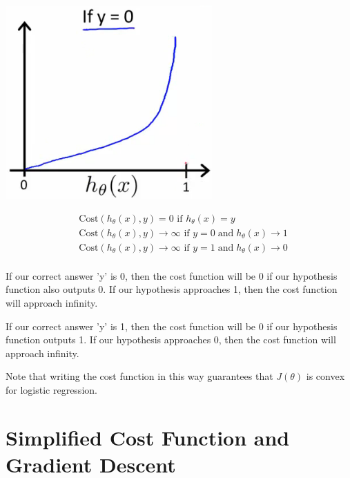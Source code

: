 \documentclass[10pt,a4paper,UTF8]{article}
\begin{document}
\begin{center}
\includegraphics[width=.9\linewidth]{../../img/computer_ng/20171008costFunction2.png}
\end{center}

\begin{align*}& \mathrm{Cost}(h_\theta(x),y) = 0 \text{ if } h_\theta(x) = y \\ & \mathrm{Cost}(h_\theta(x),y) \rightarrow \infty \text{ if } y = 0 \; \mathrm{and} \; h_\theta(x) \rightarrow 1 \\ & \mathrm{Cost}(h_\theta(x),y) \rightarrow \infty \text{ if } y = 1 \; \mathrm{and} \; h_\theta(x) \rightarrow 0 \\ \end{align*}

If our correct answer 'y' is 0, then the cost function will be 0 if our hypothesis function also outputs 0. If our hypothesis approaches 1, then the cost function will approach infinity.

If our correct answer 'y' is 1, then the cost function will be 0 if our hypothesis function outputs 1. If our hypothesis approaches 0, then the cost function will approach infinity.

Note that writing the cost function in this way guarantees that \(J(\theta)\) is convex for logistic regression.
\section{Simplified Cost Function and Gradient Descent}
\label{sec:orgc2ffc3b}
\end{document}
